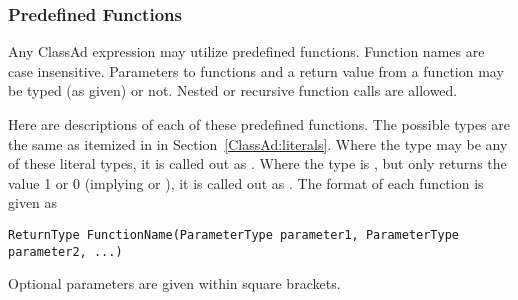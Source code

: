 \subsubsection{\label{sec:classadFunctions}Predefined Functions}
Any ClassAd expression may utilize predefined functions.
Function names are case insensitive.
Parameters to functions 
and a return value from a function 
may be typed (as given) or not.
Nested or recursive function calls are allowed.

Here are descriptions of each of these predefined functions.
The possible types are the same as itemized in 
in Section~\ref{ClassAd:literals}.
Where the type may be any of these literal types, it is
called out as \verb@AnyType@.
Where the type is \verb@Integer@, but only returns
the value 1 or 0 (implying  or ),
it is called out as \verb@Boolean@.
The format of each function is given as

\footnotesize
\begin{verbatim}
ReturnType FunctionName(ParameterType parameter1, ParameterType parameter2, ...)
\end{verbatim}
\normalsize
Optional parameters are given within square brackets.

